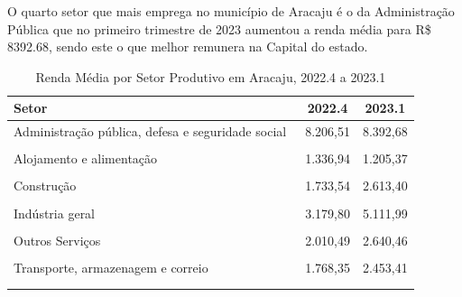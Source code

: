 \documentclass[
  12pt,
  a4paper,
]{article}
\begin{document}
O quarto setor que mais emprega no município de Aracaju é o da
Administração Pública que no primeiro trimestre de 2023 aumentou a renda
média para R\$ 8392.68, sendo este o que melhor remunera na Capital do
estado.

\FloatBarrier
\begingroup\fontsize{9}{11}\selectfont

\begin{longtable}[t]{>{\raggedright\arraybackslash}p{12.2cm}cc}
\caption{\label{tab:tab12}\label{tab12}Renda Média por Setor Produtivo em Aracaju, 2022.4 a 2023.1}\\
\toprule
Setor & 2022.4 & 2023.1\\
\midrule
Administração pública, defesa e seguridade social  & 8.206,51 & 8.392,68\\
\cellcolor[HTML]{DCDCDC}{Agricultura, pecuária, produção florestal, pesca e aquicultura} & \cellcolor[HTML]{DCDCDC}{7.142,50} & \cellcolor[HTML]{DCDCDC}{9.466,37}\\
Alojamento e alimentação  & 1.336,94 & 1.205,37\\
\cellcolor[HTML]{DCDCDC}{Comércio, reparação de veículos automotores e motocicletas} & \cellcolor[HTML]{DCDCDC}{1.880,50} & \cellcolor[HTML]{DCDCDC}{2.228,80}\\
Construção & 1.733,54 & 2.613,40\\
\addlinespace
\cellcolor[HTML]{DCDCDC}{Educação, saúde humana e serviços sociais} & \cellcolor[HTML]{DCDCDC}{5.321,67} & \cellcolor[HTML]{DCDCDC}{6.176,11}\\
Indústria geral & 3.179,80 & 5.111,99\\
\cellcolor[HTML]{DCDCDC}{Informação, comunicação e atividades financeiras, imobiliárias, profissionais e administrativas} & \cellcolor[HTML]{DCDCDC}{3.862,04} & \cellcolor[HTML]{DCDCDC}{3.359,32}\\
Outros Serviços & 2.010,49 & 2.640,46\\
\cellcolor[HTML]{DCDCDC}{Serviços domésticos} & \cellcolor[HTML]{DCDCDC}{1.064,14} & \cellcolor[HTML]{DCDCDC}{941,74}\\
\addlinespace
Transporte, armazenagem e correio  & 1.768,35 & 2.453,41\\
\bottomrule
\multicolumn{3}{l}{\rule{0pt}{1em}\textit{Fonte: IBGE (2023).}}\\
\multicolumn{3}{l}{\rule{0pt}{1em}}\\
\end{longtable}
\endgroup{}

\newpage

\renewcommand\refname{References}
  
\end{document}
